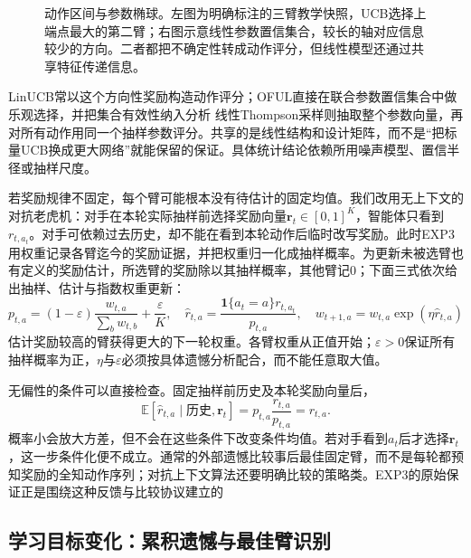\begin{figure}[t]
  \centering
  
  \caption{动作区间与参数椭球。左图为明确标注的三臂教学快照，UCB选择上端点最大的第二臂；右图示意线性参数置信集合，较长的轴对应信息较少的方向。二者都把不确定性转成动作评分，但线性模型还通过共享特征传递信息。}
  \label{fig:rl-learning-bandit-geometry}
\end{figure}

LinUCB常以这个方向性奖励构造动作评分；OFUL直接在联合参数置信集合中做乐观选择，并把集合有效性纳入分析
线性Thompson采样则抽取整个参数向量，再对所有动作用同一个抽样参数评分。共享的是线性结构和设计矩阵，而不是“把标量UCB换成更大网络”就能保留的保证。具体统计结论依赖所用噪声模型、置信半径或抽样尺度。

若奖励规律不固定，每个臂可能根本没有待估计的固定均值。我们改用无上下文的对抗老虎机：对手在本轮实际抽样前选择奖励向量$\bm{r}_t\in[0,1]^K$，智能体只看到$r_{t,a_t}$。对手可依赖过去历史，却不能在看到本轮动作后临时改写奖励。此时EXP3用权重记录各臂迄今的奖励证据，并把权重归一化成抽样概率。为更新未被选臂也有定义的奖励估计，所选臂的奖励除以其抽样概率，其他臂记0；下面三式依次给出抽样、估计与指数权重更新：
\begin{equation}
  p_{t,a}=(1-\varepsilon)\frac{w_{t,a}}{\sum_b w_{t,b}}
                 +\frac{\varepsilon}{K},\quad
  \widehat r_{t,a}=\frac{\mathbf 1\{a_t=a\}r_{t,a_t}}{p_{t,a}},
  \quad
  w_{t+1,a}=w_{t,a}\exp(\eta\widehat r_{t,a})
  \label{eq:rl-learning-exp3}
\end{equation}
估计奖励较高的臂获得更大的下一轮权重。各臂权重从正值开始；$\varepsilon>0$保证所有抽样概率为正，$\eta$与$\varepsilon$必须按具体遗憾分析配合，而不能任意取大值。

无偏性的条件可以直接检查。固定抽样前历史及本轮奖励向量后，
\[
  \mathbb E[\widehat r_{t,a}\mid\text{历史},\bm{r}_t]
  =p_{t,a}\frac{r_{t,a}}{p_{t,a}}=r_{t,a}.
\]
概率小会放大方差，但不会在这些条件下改变条件均值。若对手看到$a_t$后才选择$\bm{r}_t$，这一步条件化便不成立。通常的外部遗憾比较事后最佳固定臂，而不是每轮都预知奖励的全知动作序列；对抗上下文算法还要明确比较的策略类。EXP3的原始保证正是围绕这种反馈与比较协议建立的

\subsection{学习目标变化：累积遗憾与最佳臂识别}
\label{sec:rl-learning-best-arm}

